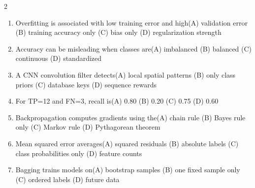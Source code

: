 \documentclass[a4paper]{article}
\begin{document}
\begin{multicols*}{2}
\begin{enumerate}
\item Overfitting is associated with low training error and high\newline\hspace*{0.6em}(A) validation error \quad (B) training accuracy only \newline\hspace*{0.6em}(C) bias only \quad (D) regularization strength
\item Accuracy can be misleading when classes are\newline\hspace*{0.6em}(A) imbalanced \quad (B) balanced \newline\hspace*{0.6em}(C) continuous \quad (D) standardized
\item A CNN convolution filter detects\newline\hspace*{0.6em}(A) local spatial patterns \quad (B) only class priors \newline\hspace*{0.6em}(C) database keys \quad (D) sequence rewards
\item For TP=12 and FN=3, recall is\newline\hspace*{0.6em}(A) 0.80 \quad (B) 0.20 \newline\hspace*{0.6em}(C) 0.75 \quad (D) 0.60
\item Backpropagation computes gradients using the\newline\hspace*{0.6em}(A) chain rule \quad (B) Bayes rule only \newline\hspace*{0.6em}(C) Markov rule \quad (D) Pythagorean theorem
\item Mean squared error averages\newline\hspace*{0.6em}(A) squared residuals \quad (B) absolute labels \newline\hspace*{0.6em}(C) class probabilities only \quad (D) feature counts
\item Bagging trains models on\newline\hspace*{0.6em}(A) bootstrap samples \quad (B) one fixed sample only \newline\hspace*{0.6em}(C) ordered labels \quad (D) future data

\end{enumerate}
\end{multicols*}
\end{document}
